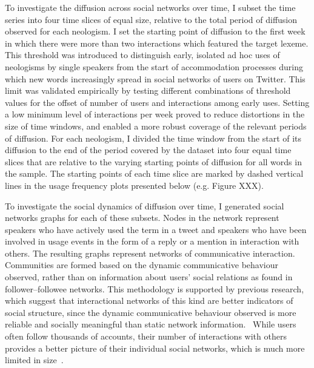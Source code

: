 \documentclass[
  a4paper,
  abstract=on,
  captions=tableabove
  ]{scrartcl}
\begin{document}
  To investigate the diffusion across social networks over time, I subset the time series into four time slices of equal size, relative to the total period of diffusion observed for each neologism. I set the starting point of diffusion to the first week in which there were more than two interactions which featured the target lexeme. This threshold was introduced to distinguish early, isolated ad hoc uses of neologisms by single speakers from the start of accommodation processes during which new words increasingly spread in social networks of users on Twitter. This limit was validated empirically by testing different combinations of threshold values for the offset of number of users and interactions among early uses. Setting a low minimum level of interactions per week proved to reduce distortions in the size of time windows, and enabled a more robust coverage of the relevant periods of diffusion. For each neologism, I divided the time window from the start of its diffusion to the end of the period covered by the dataset into four equal time slices that are relative to the varying starting points of diffusion for all words in the sample. The starting points of each time slice are marked by dashed vertical lines in the usage frequency plots presented below (e.g. Figure XXX).

  To investigate the social dynamics of diffusion over time, I generated social networks graphs for each of these subsets. Nodes in the network represent speakers who have actively used the term in a tweet and speakers who have been involved in usage events in the form of a reply or a mention in interaction with others. The resulting graphs represent networks of communicative interaction. Communities are formed based on the dynamic communicative behaviour observed, rather than on information about users' social relations as found in follower--followee networks. This methodology is supported by previous research, which suggest that interactional networks of this kind are better indicators of social structure, since the dynamic communicative behaviour observed is more reliable and socially meaningful than static network information.~\parencite{Goel2016SocialDynamics, Huberman2008SocialNetworks} While users often follow thousands of accounts, their number of interactions with others provides a better picture of their individual social networks, which is much more limited in size~\parencite{Dunbar1992NeocortexSize}.
\end{document}
